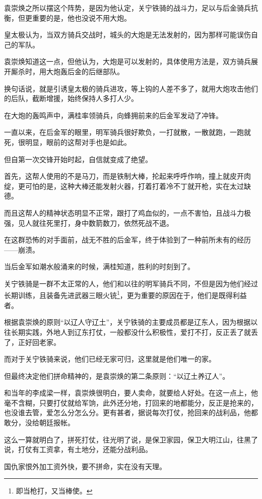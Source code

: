 \begin{multicols}{\theparacolNo}
袁崇焕之所以摆这个阵势，是因为他认定，关宁铁骑的战斗力，足以与后金骑兵抗衡，但更重要的是，他也没说不用大炮。

皇太极认为，当双方骑兵交战时，城头的大炮是无法发射的，因为那样可能误伤自己的军队。

袁崇焕知道这一点，但他认为，大炮是可以发射的，具体使用方法是，双方骑兵展开厮杀时，用大炮轰后金的后继部队。

换句话说，就是引诱皇太极的骑兵进攻，等上钩的人差不多了，就用大炮攻击他们的后队，截断增援，始终保持人多打人少。

在大炮的轰鸣声中，满桂率领骑兵，向蜂拥前来的后金军发动了冲锋。

一直以来，在后金军的眼里，明军骑兵很好欺负，一打就散，一散就跑，一跑就死，很明显，眼前的这帮对手也是如此。

但自第一次交锋开始时起，自信就变成了绝望。

首先，这帮人使用的不是马刀，而是铁制大棒，抡起来呼呼作响，撞上就皮开肉绽，更可怕的是，这种大棒还能发射火器，打着打着冷不丁就开枪，实在太过缺德。

而且这帮人的精神状态明显不正常，跟打了鸡血似的，一点不害怕，且战斗力极强，见人就往死里打，身中数箭数刀，依然死战不退。

在这群恐怖的对手面前，战无不胜的后金军，终于体验到了一种前所未有的经历——崩溃。

当后金军如潮水般涌来的时候，满桂知道，胜利的时刻到了。

关宁铁骑是一群不太正常的人，他们和以往的明军骑兵不同，不但是因为他们经过长期训练，且装备先进武器三眼火铳\footnote{即当枪打，又当棒使。}，更为重要的原因在于，他们是既得利益者。

根据袁崇焕的原则“以辽人守辽土”，关宁铁骑的主要成员都是辽东人，因为根据以往长期实践，外地人到辽东打仗，一般都没什么积极性，爱打不打，反正丢了就丢了，正好回老家。

而对于关宁铁骑来说，他们已经无家可归，这里就是他们唯一的家。

但最终决定他们拼命精神的，是袁崇焕的第二条原则：“以辽土养辽人”。

和当年的李成梁一样，袁崇焕很明白，要人卖命，就要给人好处。在这一点上，他毫不含糊，只要打仗就给军饷，此外还分地，打回来的地都能分，反正是抢来的，也没谁去管，爱怎么分怎么分。更有甚者，据说每次打仗，抢回来的战利品，他都敢分，没给朝廷报帐。

这么一算就明白了，拼死打仗，往光明了说，是保卫家园，保卫大明江山，往黑了说，打仗有工资拿，有土地分，还能分战利品。

国仇家恨外加工资外快，要不拼命，实在没有天理。


\end{multicols}
